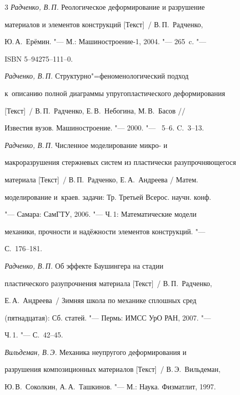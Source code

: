 \begin{thebibliography}{3}
\emph{Радченко, В.\,П.} Реологическое деформирование и разрушение

материалов и элементов конструкций [Текст]~/ В.\,П.~Радченко,

Ю.\,А.~Ерёмин. "--- М.: Машиностроение-1, 2004. "--- 265~c. "---

ISBN 5--94275--111--0.




\emph{Радченко, В.\,П.} Структурно"=феноменологический подход 

к~описанию полной диаграммы упругопластического деформирования

[Текст]~/ В.\,П.~Радченко, Е.\,В.~Небогина, М.\,В.~Басов /\!/

Известия вузов. Машиностроение. "--- 2000. "--- \No~5--6. C.~3--13.




\emph{Радченко, В.\,П.} Численное моделирование микро- и

макроразрушения стержневых систем из пластически разупрочняющегося

материала [Текст]~/ В.\,П.~Радченко, Е.\,А.~Андреева / Матем.

моделирование и~краев. задачи: Тр. Третьей Всерос. научн. конф.

"---  Самара: СамГТУ, 2006. "--- Ч.\,1: Математические модели

механики, прочности и надёжности элементов конструкций. "---

С.~176--181.




\emph{Радченко, В.\,П.} Об эффекте Баушингера на стадии

пластического разупрочнения материала [Текст]~/ В.\,П.~Радченко,

Е.\,А.~Андреева~/ Зимняя школа по механике сплошных сред

(пятнадцатая): Сб. статей.  "--- Пермь: ИМСС УрО РАН, 2007. "---

Ч.\,1. "--- С.~42--45.




\emph{Вильдеман, В.\,Э.} Механика неупругого деформирования и

разрушения композиционных материалов [Текст]~/ В.\,Э.~Вильдеман,

Ю.\,В.~Соколкин, А.\,А.~Ташкинов. "--- М.: Наука. Физматлит, 1997.


\end{thebibliography}
